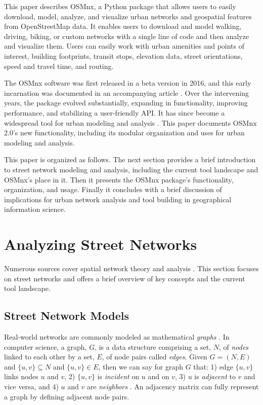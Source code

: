 \documentclass[12pt,letterpaper]{article} %
\begin{document}
This paper describes OSMnx, a Python package that allows users to easily download, model, analyze, and visualize urban networks and geospatial features from OpenStreetMap data. It enables users to download and model walking, driving, biking, or custom networks with a single line of code and then analyze and visualize them. Users can easily work with urban amenities and points of interest, building footprints, transit stops, elevation data, street orientations, speed and travel time, and routing.

The OSMnx software was first released in a beta version in 2016, and this early incarnation was documented in an accompanying article \citep{boeing_osmnx:_2017}. Over the intervening years, the package evolved substantially, expanding in functionality, improving performance, and stabilizing a user-friendly API. It has since become a widespread tool for urban modeling and analysis \citep{boeing_right_2020}. This paper documents OSMnx 2.0's new functionality, including its modular organization and uses for urban modeling and analysis.

This paper is organized as follows. The next section provides a brief introduction to street network modeling and analysis, including the current tool landscape and OSMnx's place in it. Then it presents the OSMnx package's functionality, organization, and usage. Finally it concludes with a brief discussion of implications for urban network analysis and tool building in geographical information science.

\section{Analyzing Street Networks}

Numerous sources cover spatial network theory and analysis \citep[e.g.,][]{tinkler_graph_1979,barnes_graph_1983,gastner_spatial_2006,barthelemy_spatial_2011,ducruet_spatial_2014,fischer_spatial_2014,marshall_street_2018}. This section focuses on street networks and offers a brief overview of key concepts and the current tool landscape.

\subsection{Street Network Models}

Real-world networks are commonly modeled as mathematical \textit{graphs} \citep{trudeau_introduction_1994}. In computer science, a graph, $G$, is a data structure comprising a set, $N$, of \textit{nodes} linked to each other by a set, $E$, of node pairs called \textit{edges}. Given $G = (N, E)$ and $\{u, v\} \subseteq N$ and $\{u, v\} \in E$, then we can say for graph $G$ that: 1) edge $\{u, v\}$ links nodes $u$ and $v$, 2) $\{u, v\}$ is \textit{incident} on $u$ and on $v$, 3) $u$ is \textit{adjacent} to $v$ and vice versa, and 4) $u$ and $v$ are \textit{neighbors} \citep{newman_networks:_2010}. An adjacency matrix can fully represent a graph by defining adjacent node pairs.
\end{document}
